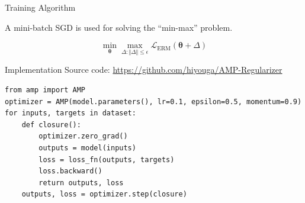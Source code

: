\begin{frame}{Training Algorithm}

A mini-batch SGD is used for solving the ``min-max'' problem.

\vspace{-0.5em}

\begin{equation*}
\min_{\boldsymbol{\theta}}\max_{\Delta:\Vert\Delta\Vert\le\epsilon}\mathcal{L}_\mathrm{ERM}(\boldsymbol{\theta}+\Delta)
\end{equation*}

\begin{algorithm}[H]
\SetAlgoVlined
{}
\caption{Adversarial Model Perturbation Training}
\end{algorithm}

\vspace{1em}

\end{frame}

\begin{frame}[fragile]{Implementation}
Source code: \url{https://github.com/hiyouga/AMP-Regularizer}

\begin{verbatim}
from amp import AMP
optimizer = AMP(model.parameters(), lr=0.1, epsilon=0.5, momentum=0.9)
for inputs, targets in dataset:
    def closure():
        optimizer.zero_grad()
        outputs = model(inputs)
        loss = loss_fn(outputs, targets)
        loss.backward()
        return outputs, loss
    outputs, loss = optimizer.step(closure)
\end{verbatim}
\end{frame}
